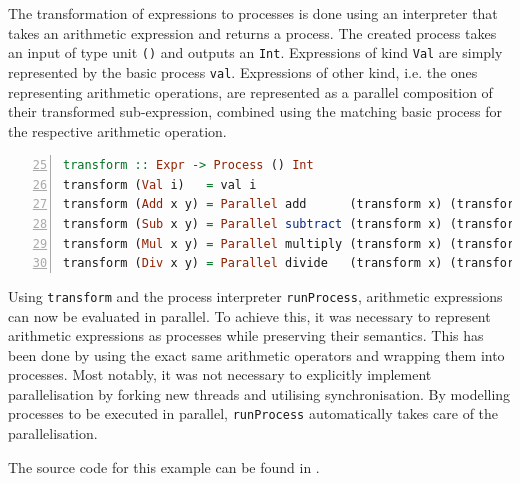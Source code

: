 The transformation of expressions to processes is done using an interpreter \cite{Gamma:1995:DPE:186897} that takes an arithmetic expression and returns a process. The created process takes an input of type unit \texttt{()} and outputs an \texttt{Int}. Expressions of kind \texttt{Val} are simply represented by the basic process \texttt{val}. Expressions of other kind, i.e. the ones representing arithmetic operations, are represented as a parallel composition of their transformed sub-expression, combined using the matching basic process for the respective arithmetic operation.
\begin{lstlisting}[language=Haskell, caption=Transformation of arithmetic expressions into processes., label=lst:arith_transformation, numbers=left, frame=bt, firstnumber=25, basicstyle=\footnotesize\ttfamily]
transform :: Expr -> Process () Int
transform (Val i)   = val i
transform (Add x y) = Parallel add      (transform x) (transform y)
transform (Sub x y) = Parallel subtract (transform x) (transform y)
transform (Mul x y) = Parallel multiply (transform x) (transform y)
transform (Div x y) = Parallel divide   (transform x) (transform y)
\end{lstlisting}

Using \texttt{transform} and the process interpreter \texttt{runProcess}, arithmetic expressions can now be evaluated in parallel. To achieve this, it was necessary to represent arithmetic expressions as processes while preserving their semantics. This has been done by using the exact same arithmetic operators and wrapping them into processes. Most notably, it was not necessary to explicitly implement parallelisation by forking new threads and utilising synchronisation. By modelling processes to be executed in parallel, \texttt{runProcess} automatically takes care of the parallelisation.

The source code for this example can be found in .